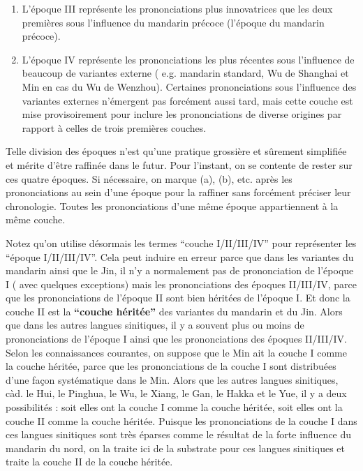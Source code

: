 \documentclass{scrbook}
\newcounter{c}[subsubsection]
\begin{document}
\begin{sloppypar}
\begin{enumerate}
\item{L'époque III représente les prononciations plus innovatrices que les deux premières sous l'influence du mandarin précoce (l'époque du mandarin précoce).}

\item{L'époque IV représente les prononciations les plus récentes sous l'influence de beaucoup de variantes externe ( e.g. mandarin standard, Wu de Shanghai et Min en cas du Wu de Wenzhou). Certaines prononciations sous l'influence des variantes externes n'émergent pas forcément aussi tard, mais cette couche est mise provisoirement pour inclure les prononciations de diverse origines par rapport à celles de trois premières couches.}
\end{enumerate}

Telle division des époques n'est qu'une pratique grossière et sûrement simplifiée et mérite d'être raffinée dans le futur. Pour l'instant, on se contente de rester sur ces quatre époques. Si nécessaire, on marque (a), (b), etc. après les prononciations au sein d'une époque pour la raffiner sans forcément préciser leur chronologie. Toutes les prononciations d'une même époque appartiennent à la même couche.

Notez qu'on utilise désormais les termes ``couche I/II/III/IV'' pour représenter les ``époque I/II/III/IV''. Cela peut induire en erreur parce que dans les variantes du mandarin ainsi que le Jin, il n'y a normalement pas de prononciation de l'époque I ( avec quelques exceptions) mais les prononciations des époques II/III/IV, parce que les prononciations de l'époque II sont bien héritées de l'époque I. Et donc la couche II est la \textbf{``couche héritée''} des variantes du mandarin et du Jin. Alors que dans les autres langues sinitiques, il y a souvent plus ou moins de prononciations de l'époque I ainsi que les prononciations des époques II/III/IV. Selon les connaissances courantes, on suppose que le Min ait la couche I comme la couche héritée, parce que les prononciations de la couche I sont distribuées d'une façon systématique dans le Min. Alors que les autres langues sinitiques, càd. le Hui, le Pinghua, le Wu, le Xiang, le Gan, le Hakka et le Yue, il y a deux possibilités : soit elles ont la couche I comme la couche héritée, soit elles ont la couche II comme la couche héritée. Puisque les prononciations de la couche I dans ces langues sinitiques sont très éparses comme le résultat de la forte influence du mandarin du nord, on la traite ici de la substrate pour ces langues sinitiques et traite la couche II de la couche héritée.


\end{sloppypar}
\end{document}
